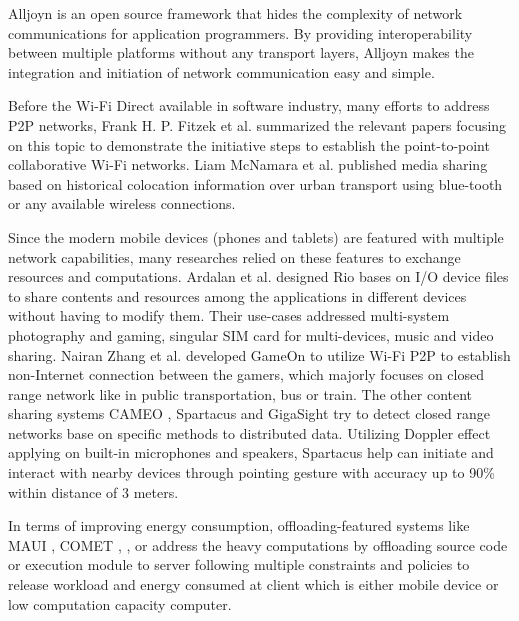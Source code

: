 \documentclass{sig-alternate}[10pt]
\begin{document}
Alljoyn \cite{alljoyn} is an open source framework that hides the complexity of network communications for application programmers. By providing interoperability between multiple platforms without any transport layers, Alljoyn makes the integration and initiation of network communication easy and simple. 

Before the Wi-Fi Direct available in software industry, many efforts to address P2P networks, Frank H. P. Fitzek et al. \cite{m_p2p_tutor} summarized the relevant papers focusing on this topic to demonstrate the initiative steps to establish the point-to-point collaborative Wi-Fi networks. Liam McNamara et al. published \cite{media_share} media sharing based on historical colocation information over urban transport using blue-tooth or any available wireless connections.

Since the modern mobile devices (phones and tablets) are featured with multiple network capabilities, many researches relied on these features to exchange resources and computations. Ardalan et al. designed Rio \cite{rio} bases on I/O device files to share contents and resources among the applications in different devices without having to modify them. Their use-cases addressed multi-system photography and gaming, singular SIM card for multi-devices, music and video sharing. Nairan Zhang et al. developed GameOn \cite{gameon} to utilize Wi-Fi P2P to establish non-Internet connection between the gamers, which majorly focuses on closed range network like in public transportation, bus or train. The other content sharing systems CAMEO \cite{cameo}, Spartacus \cite{spartacus} and GigaSight \cite{crowd-sourcing} try to detect closed range networks base on specific methods to distributed data. Utilizing Doppler effect applying on built-in microphones and speakers, Spartacus help can initiate and interact with nearby devices through pointing gesture with accuracy up to 90\% within distance of 3 meters.

In terms of improving energy consumption, offloading-featured systems like MAUI \cite{maui}, COMET \cite{comet}, \cite{kwon+:mobilesoft15}, \cite{mobile-cloud-middleware} or \cite{fuzzy-engine} address the heavy computations by offloading source code or execution module to server following multiple constraints and policies to release workload and energy consumed at client which is either mobile device or low computation capacity computer. 
\end{document}
